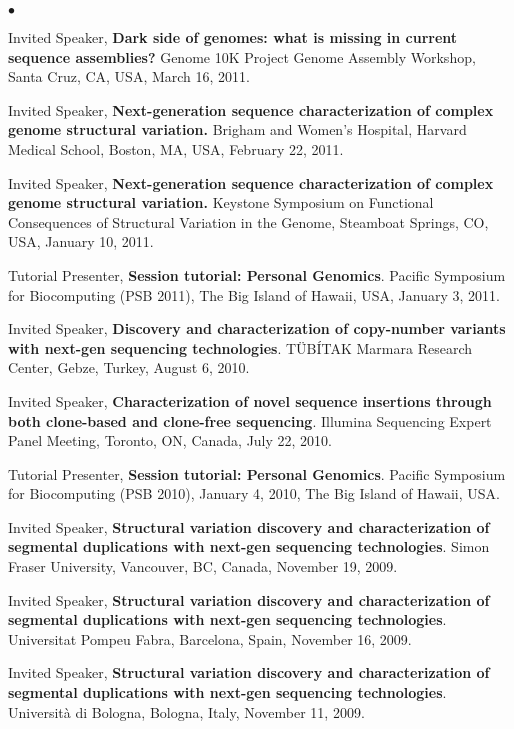 \documentclass[margin,line]{res}
\newenvironment{list2}{
  \begin{list}{$\bullet$}{%
      \setlength{\itemsep}{0in}
      \setlength{\parsep}{0in} \setlength{\parskip}{0in}
      \setlength{\topsep}{0in} \setlength{\partopsep}{0in} 
      \setlength{\leftmargin}{0.2in}}}{\end{list}}
\begin{document}
\begin{resume}
\begin{list2}
\item
  Invited Speaker, 
  {\bf Dark side of genomes: what is missing in current sequence assemblies?}
  Genome 10K Project Genome Assembly Workshop, Santa Cruz, CA, USA, March 16, 2011.



\item
  Invited Speaker, 
  {\bf  Next-generation sequence characterization of complex genome structural variation.}
 Brigham and Women's Hospital, Harvard Medical School, Boston, MA, USA, February 22, 2011.

\item
  Invited Speaker, 
  {\bf  Next-generation sequence characterization of complex genome structural variation.}
  Keystone Symposium on Functional Consequences of Structural Variation in the Genome,
  Steamboat Springs, CO, USA, January 10, 2011.
\item 
  Tutorial Presenter, {\bf Session tutorial: Personal Genomics}.
  Pacific Symposium for Biocomputing (PSB 2011),
  The Big Island of Hawaii, USA,   January 3, 2011.
\item
  Invited Speaker, {\bf Discovery and characterization of copy-number variants with next-gen sequencing technologies}.
  T\"{U}B\'{I}TAK Marmara Research Center, Gebze, Turkey, August 6, 2010.
\item
  Invited Speaker, {\bf Characterization of novel sequence insertions through both clone-based and clone-free sequencing}. Illumina Sequencing Expert Panel Meeting, 
  Toronto, ON, Canada, July 22, 2010.
\item 
  Tutorial Presenter, {\bf Session tutorial: Personal Genomics}.
  Pacific Symposium for Biocomputing (PSB 2010),
  January 4, 2010, The Big Island of Hawaii, USA.
\item 
  Invited Speaker, {\bf Structural variation discovery and characterization of segmental duplications with next-gen sequencing technologies}.
  Simon Fraser University,
  Vancouver, BC, Canada, November 19, 2009.
\item 
  Invited Speaker, {\bf Structural variation discovery and characterization of segmental duplications with next-gen sequencing technologies}.
  Universitat Pompeu Fabra,
  Barcelona, Spain, November 16, 2009.

\item 
  Invited Speaker, {\bf Structural variation discovery and characterization of segmental duplications with next-gen sequencing technologies}.
  Universit\`{a} di Bologna,
  Bologna, Italy, November 11, 2009.


\end{list2}
\end{resume}
\end{document}
